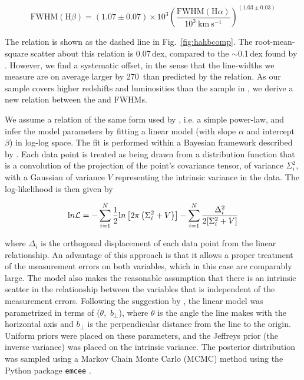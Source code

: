 \begin{equation}
  \mathrm{FWHM}(\mathrm{H}\beta) = \left( 1.07 \pm 0.07 \right) \times 10^3 \left( \frac{ \mathrm{FWHM}(\mathrm{H}\alpha) }{10^3 ~\mathrm{km}~\mathrm{s}^{-1} } \right)^{(1.03 \pm 0.03)}
\end{equation}

The relation is shown as the dashed line in Fig.~\ref{fig:hahbcomp}.
The root-mean-square scatter about this relation is 0.07\,dex, compared to the $\sim$0.1\,dex found by \citet{greene05b}. 
However, we find a systematic offset, in the sense that the \hb line-widths we measure are on average larger by 270\kms\, than predicted by the \citet{greene05b} relation. 
As our sample covers higher redshifts and luminosities than the sample in \citet{greene05b}, we derive a new relation between the \ha and \hb FWHMs.       

We assume a relation of the same form used by \citet{greene05b}, i.e. a simple power-law, and infer the model parameters by fitting a linear model (with slope $\alpha$ and intercept $\beta$) in log-log space.
The fit is performed within a Bayesian framework described by \citet{hogg10}. 
Each data point is treated as being drawn from a distribution function that is a convolution of the projection of the point's covariance tensor, of variance $\Sigma_i^2$, with a Gaussian of variance $V$ representing the intrinsic variance in the data.
The log-likelihood is then given by 

\begin{equation}
  {\mathrm ln} {\cal L} = - \sum_{i=1}^N \frac{1}{2} {\mathrm ln}\left[2\pi\left(\Sigma_i^2 + V\right)\right] - \sum_{i=1}^N \frac{\Delta_i^2}{2[\Sigma_i^2 + V]} 
\end{equation}

\noindent where $\Delta_i$ is the orthogonal displacement of each data point from the linear relationship. 
An advantage of this approach is that it allows a proper treatment of the measurement errors on both variables, which in this case are comparably large.
The model also makes the reasonable assumption that there is an intrinsic scatter in the relationship between the variables that is independent of the measurement errors.  
Following the suggestion by \citet{hogg10}, the linear model was parametrized in terms of ($\theta$,~$b_\bot$), where $\theta$ is the angle the line makes with the horizontal axis and $b_\bot$ is the perpendicular distance from the line to the origin.
Uniform priors were placed on these parameters, and the Jeffreys prior (the inverse variance) was placed on the intrinsic variance. 
The posterior distribution was sampled using a Markov Chain Monte Carlo (MCMC) method using the Python package {\tt emcee} \citep{foreman13}. 
 
